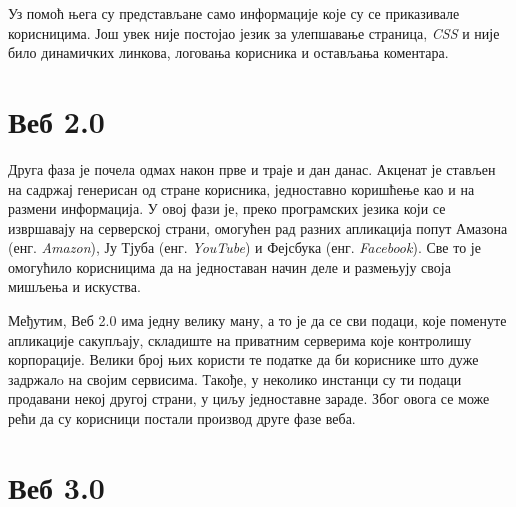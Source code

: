 \documentclass[12pt,oneside]{memoir}
\begin{document}
Уз помоћ њега су представљане само информације које су се приказивале корисницима. Још увек није постојао језик за улепшавање страница, \textit{CSS} и није било динамичких линкова, логовања корисника и остављања коментара.



\section{Веб 2.0}
\label{sec:sem_veb_veb_2}

Друга фаза је почела одмах након прве и траје и дан данас. Акценат је стављен на садржај генерисан од стране корисника, једноставно коришћење као и на размени информација. У овој фази је, преко програмских језика који се извршавају на серверској страни, омогућен рад разних апликација попут Амазона (енг. \textit{Amazon}), Ју Тјуба (енг. \textit{YouTube}) и Фејсбука (енг. \textit{Facebook}). Све то је омогућило корисницима да на једноставан начин деле и размењују своја мишљења и искуства.


Међутим, Веб 2.0 има једну велику ману, а то је да се сви подаци, које поменуте апликације сакупљају, складиште на приватним серверима које контролишу корпорације. Велики број њих користи те податке да би кориснике што дуже задржалo на својим сервисима. Такође, у неколико инстанци су ти подаци продавани некој другој страни, у циљу једноставне зараде. Због овога се може рећи да су корисници постали производ друге фазе веба.

\section{Веб 3.0}
\label{sec:sem_veb_veb_3}
\end{document}

